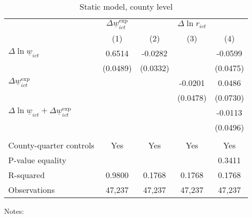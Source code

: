\begin{table}
    \caption{Static model, county level}
    \label{tab:static_county}

    \begin{tabular}{l*{4}{c}}
    \toprule
     & \multicolumn{1}{c}{$\Delta \underline{w}_{ict}^{\text{exp}}$}
     & \multicolumn{3}{c}{$\Delta \ln r_{ict}$}                                  \\ \cmidrule(lr){2-2}\cmidrule(lr){3-5}
     & \multicolumn{1}{c}{(1)} & \multicolumn{1}{c}{(2)} 
     & \multicolumn{1}{c}{(3)} & \multicolumn{1}{c}{(4)}                         \\ \midrule
    $\Delta \ln \underline{w}_{ict}$          &  0.6514  &  -0.0282  &       &  -0.0599     \\
                                              & (0.0489) & (0.0332) &       & (0.0475)    \\
    $\Delta \underline{w}_{ict}^{\text{exp}}$ &       &       &  -0.0201  & 0.0486      \\
                                              &       &       & (0.0478) & (0.0730)    \\ \midrule
    $\Delta \ln \underline{w}_{ict}+
      \Delta \underline{w}_{ict}^{\text{exp}}$&       &       &       &  -0.0113     \\
                                              &       &       &       & (0.0496)    \\
                                              &       &       &       &          \\ \midrule
    County-quarter controls                   &  Yes  & Yes   & Yes   & Yes      \\
    P-value equality                          &       &       &       & 0.3411      \\
    R-squared                                 &  0.9800  &  0.1768  &  0.1768  & 0.1768      \\
    Observations                              & 47,237  & 47,237  & 47,237  & 47,237     \\\bottomrule
    \end{tabular}

    \begin{minipage}{.95\textwidth} \footnotesize
        \vspace{2mm}
        Notes: 
    \end{minipage}
\end{table}
